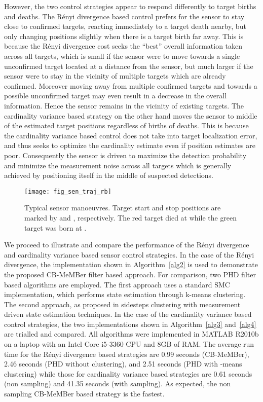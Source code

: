 \documentclass[twocolumn]{autart}
\begin{document}
However, the two control strategies appear to respond differently to target births and deaths. The R\'{e}nyi divergence based control prefers for the sensor to stay close to confirmed targets, reacting immediately to a target death nearby, but only changing positions slightly when there is a target birth far away. This is because the R\'{e}nyi divergence cost seeks the ``best'' overall information taken across all targets, which is small if the sensor were to move towards a single unconfirmed target located at a distance from the sensor, but much larger if the sensor were to stay in the vicinity of multiple targets which are already confirmed. Moreover moving away from multiple confirmed targets and towards a possible unconfirmed target may even result in a decrease in the overall information. Hence the sensor remains in the vicinity of existing targets. The cardinality variance based strategy on the other hand moves the sensor to middle of the estimated target positions regardless of births of deaths. This is because the cardinality variance based control does not take into target localization error, and thus seeks to optimize the cardinality estimate even if position estimates are poor. Consequently the sensor is driven to maximize the detection probability and minimize the measurement noise across all targets which is generally achieved by positioning itself in the middle of suspected detections.
\begin{figure}[htb]
\centering
\texttt{[image: fig\_sen\_traj\_rb]}
\caption{Typical sensor manoeuvres. Target start and stop positions are marked by  and , respectively. The red target died at  while the green target was born at .}
\label{fig1}
\end{figure}

We proceed to illustrate and compare the performance of the R\'{e}nyi
divergence and cardinality variance based sensor control strategies. In the case of the R\'{e}nyi
divergence, the implementation shown in Algorithm~\ref{alg2} is used to demonstrate the proposed CB-MeMBer filter based approach. For comparison, two PHD filter based algorithms are employed. The first approach uses a standard SMC implementation, which performs state estimation through k-means clustering. The second approach, as proposed in \cite{RVC11} sidesteps clustering with measurement driven state estimation techniques. In the case of the cardinality variance based control strategies, the two implementations shown in Algorithm~\ref{alg3} and~\ref{alg4} are trialled and compared. All algorithms were implemented in MATLAB R2010b on a laptop with an Intel Core i5-3360 CPU and 8GB of RAM. The average run time for the R\'{e}nyi divergence based strategies are 0.99 seconds (CB-MeMBer), 2.46 seconds (PHD without clustering), and  2.51 seconds (PHD with -means clustering) while those for cardinality variance based strategies are 0.61 seconds (non sampling) and 41.35 seconds (with sampling). As expected, the non sampling CB-MeMBer based strategy is the fastest.
\end{document}
